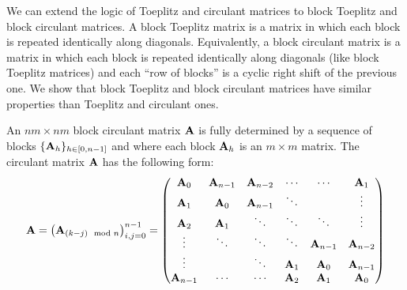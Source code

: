 We can extend the logic of Toeplitz and circulant matrices to block Toeplitz and block circulant matrices.
A block Toeplitz matrix is a matrix in which each block is repeated identically along diagonals.
Equivalently, a block circulant matrix is a matrix in which each block is repeated identically along diagonals (like block Toeplitz matrices) and each ``row of blocks'' is a cyclic right shift of the previous one.
We show that block Toeplitz and block circulant matrices have similar properties than Toeplitz and circulant ones.

An $nm \times nm$ block circulant matrix $\mathbf{A}$ is fully determined by a sequence of blocks $\{\mathbf{A}_h\}_{h \in [0,n-1]}$ and where each block $\mathbf{A}_h$ is an $m \times m$ matrix.
The circulant matrix $\mathbf{A}$ has the following form:
\begin{equation}
  \Amat = \leftmat \Amat_{(k-j) \mod n} \rightmat_{i, j = 0}^{n-1} = 
  \leftmatrix
    \Amat_{0}   & \Amat_{n-1} & \Amat_{n-2} & \cdots    & \cdots      & \Amat_{1}   \\
    \Amat_{1}   & \Amat_{0}   & \Amat_{n-1} & \ddots    &             & \vdots      \\
    \Amat_{2}   & \Amat_{1}   & \ddots      & \ddots    & \ddots      & \vdots      \\ 
    \vdots      & \ddots      & \ddots      & \ddots    & \Amat_{n-1} & \Amat_{n-2} \\
    \vdots      &             & \ddots      & \Amat_{1} & \Amat_{0}   & \Amat_{n-1} \\
    \Amat_{n-1} & \cdots      & \cdots      & \Amat_{2} & \Amat_{1}   & \Amat_{0}
  \rightmatrix
\end{equation}


